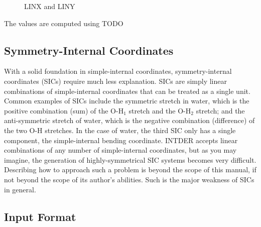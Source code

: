 \documentclass{article}
\begin{document}
\begin{figure}[ht]
  \centering
  \caption{LINX and LINY}
  \label{fig:linxy}

\end{figure}

The values are computed using TODO

\subsection{Symmetry-Internal Coordinates}
\label{sec:symm}

With a solid foundation in simple-internal coordinates, symmetry-internal
coordinates (SICs) require much less explanation. SICs are simply linear
combinations of simple-internal coordinates that can be treated as a single
unit. Common examples of SICs include the symmetric stretch in water, which is
the positive combination (sum) of the O-H$_1$ stretch and the O-H$_2$ stretch;
and the anti-symmetric stretch of water, which is the negative combination
(difference) of the two O-H stretches. In the case of water, the third SIC only
has a single component, the simple-internal bending coordinate. INTDER accepts
linear combinations of any number of simple-internal coordinates, but as you may
imagine, the generation of highly-symmetrical SIC systems becomes very
difficult. Describing how to approach such a problem is beyond the scope of this
manual, if not beyond the scope of its author's abilities. Such is the major
weakness of SICs in general.

\subsection{Input Format}
\label{sec:coord-inp}
\end{document}
